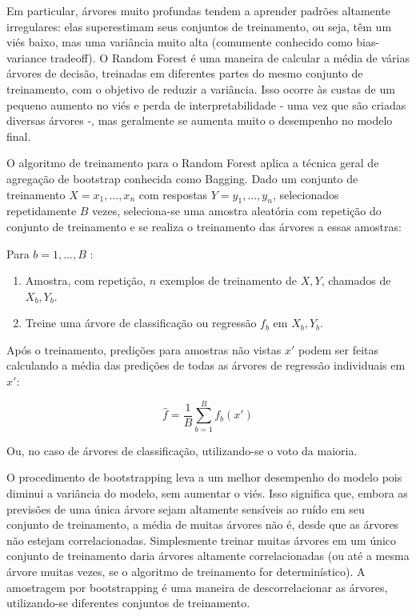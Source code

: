 Em particular, árvores muito profundas tendem a aprender padrões altamente irregulares: elas superestimam seus conjuntos de treinamento, ou seja, têm um viés baixo, mas uma variância muito alta (comumente conhecido como bias-variance tradeoff). O Random Forest é uma maneira de calcular a média de várias árvores de decisão, treinadas em diferentes partes do mesmo conjunto de treinamento, com o objetivo de reduzir a variância. Isso ocorre às custas de um pequeno aumento no viés e perda de interpretabilidade - uma vez que são criadas diversas árvores -, mas geralmente se aumenta muito o desempenho no modelo final.

O algoritmo de treinamento para o Random Forest aplica a técnica geral de agregação de bootstrap conhecida como Bagging. Dado um conjunto de treinamento $ {\displaystyle X = x_{1},\ldots ,x_{n}} $ com respostas $ {\displaystyle Y = y_{1},\ldots ,y_{n}} $, selecionados repetidamente $ B $ vezes, seleciona-se uma amostra aleatória com repetição do conjunto de treinamento e se realiza o treinamento das árvores a essas amostras:

Para $ b = 1, ..., B $ :

\begin{enumerate}
	\item Amostra, com repetição, $ n $ exemplos de treinamento de $ X, Y $, chamados de $ X_b, Y_b $.
	\item Treine uma árvore de classificação ou regressão $ f_b $ em $ X_b, Y_b $.
\end{enumerate}

Após o treinamento, predições para amostras não vistas $ x' $ podem ser feitas calculando a média das predições de todas as árvores de regressão individuais em $ x' $:

\begin{equation}
{\displaystyle {\hat {f}}={\frac {1}{B}}\sum _{b=1}^{B}f_{b}(x')}
\end{equation}

Ou, no caso de árvores de classificação, utilizando-se o voto da maioria.

O procedimento de bootstrapping leva a um melhor desempenho do modelo pois diminui a variância do modelo, sem aumentar o viés. Isso significa que, embora as previsões de uma única árvore sejam altamente sensíveis ao ruído em seu conjunto de treinamento, a média de muitas árvores não é, desde que as árvores não estejam correlacionadas. Simplesmente treinar muitas árvores em um único conjunto de treinamento daria árvores altamente correlacionadas (ou até a mesma árvore muitas vezes, se o algoritmo de treinamento for determinístico). A amostragem por bootstrapping é uma maneira de descorrelacionar as árvores, utilizando-se diferentes conjuntos de treinamento.

